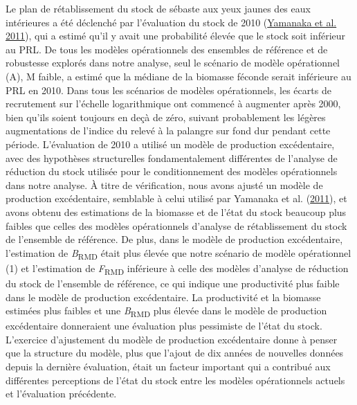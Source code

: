 \documentclass[french,11pt]{book}
\begin{document}
Le plan de rétablissement du stock de sébaste aux yeux jaunes des eaux intérieures a été déclenché par l'évaluation du stock de 2010 (\protect\hyperlink{ref-yamanaka2011}{Yamanaka et al. 2011}), qui a estimé qu'il y avait une probabilité élevée que le stock soit inférieur au PRL. De tous les modèles opérationnels des ensembles de référence et de robustesse explorés dans notre analyse, seul le scénario de modèle opérationnel (A), M faible, a estimé que la médiane de la biomasse féconde serait inférieure au PRL en 2010. Dans tous les scénarios de modèles opérationnels, les écarts de recrutement sur l'échelle logarithmique ont commencé à augmenter après 2000, bien qu'ils soient toujours en deçà de zéro, suivant probablement les légères augmentations de l'indice du relevé à la palangre sur fond dur pendant cette période. L'évaluation de 2010 a utilisé un modèle de production excédentaire, avec des hypothèses structurelles fondamentalement différentes de l'analyse de réduction du stock utilisée pour le conditionnement des modèles opérationnels dans notre analyse. À titre de vérification, nous avons ajusté un modèle de production excédentaire, semblable à celui utilisé par Yamanaka et al. (\protect\hyperlink{ref-yamanaka2011}{2011}), et avons obtenu des estimations de la biomasse et de l'état du stock beaucoup plus faibles que celles des modèles opérationnels d'analyse de rétablissement du stock de l'ensemble de référence. De plus, dans le modèle de production excédentaire, l'estimation de \emph{B}\textsubscript{RMD} était plus élevée que notre scénario de modèle opérationnel (1) et l'estimation de \emph{F}\textsubscript{RMD} inférieure à celle des modèles d'analyse de réduction du stock de l'ensemble de référence, ce qui indique une productivité plus faible dans le modèle de production excédentaire. La productivité et la biomasse estimées plus faibles et une \emph{B}\textsubscript{RMD} plus élevée dans le modèle de production excédentaire donneraient une évaluation plus pessimiste de l'état du stock. L'exercice d'ajustement du modèle de production excédentaire donne à penser que la structure du modèle, plus que l'ajout de dix années de nouvelles données depuis la dernière évaluation, était un facteur important qui a contribué aux différentes perceptions de l'état du stock entre les modèles opérationnels actuels et l'évaluation précédente.
\end{document}
